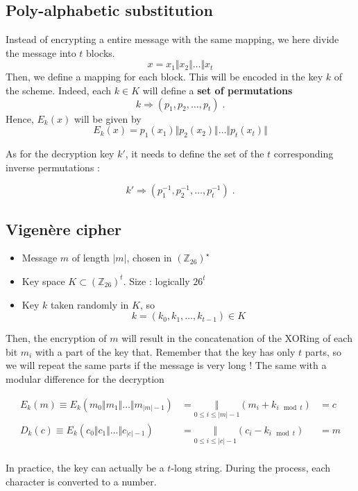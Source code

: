 \documentclass[../Cryptography.tex]{subfiles}
\begin{document}
\subsection{Poly-alphabetic substitution}
Instead of encrypting a entire message with the same mapping, we here divide the message into $t$ blocks.
$$ x = x_1 \Vert x_2 \Vert \dots \Vert x_t$$
Then, we define a mapping for each block. This will be encoded in the key $k$ of the scheme. Indeed, each $k\in K$ will define a \textbf{set of permutations} 
$$k \Rightarrow (p_1, p_2, \dots, p_t) \; .$$
Hence, $E_k(x)$ will be given by 
$$E_k(x) = p_1(x_1) \Vert p_2(x_2) \Vert \dots \Vert p_t(x_t) \Vert $$

As for the decryption key $k'$, it needs to define the set of the $t$ corresponding inverse permutations :

$$k' \Rightarrow (p_1^{-1}, p_2^{-1}, \dots, p_t^{-1}) \; .$$

\subsection{Vigenère cipher} 
\begin{itemize}
    \item Message $m$ of length $|m|$, chosen in $(\mathbb{Z}_{26})^\star$
    \item Key space $K \subset (\mathbb{Z}_{26})^t$. Size : logically $26^t$
    \item Key $k$ taken randomly in $K$, so 
    $$k = (k_0, k_1, \dots, k_{t-1}) \in K$$
\end{itemize}
Then, the encryption of $m$ will result in the concatenation of the XORing of each bit $m_i$ with a part of the key that. Remember that the key has only $t$ parts, so we will repeat the same parts if the message is very long ! The same with a modular difference for the decryption

$$\begin{array}{rll}
    E_k(m) \equiv E_k(m_0 \Vert m_1 \Vert \dots \Vert m_{|m|-1}) &=  \underset{\scriptscriptstyle{0\leq i \leq |m|-1}}{\Vert} (m_i + k_{i  \mod{t}}) &= c \\
    D_k(c) \equiv E_k(c_0 \Vert c_1 \Vert \dots \Vert c_{|c|-1}) &=  \underset{\scriptscriptstyle{0\leq i \leq |c|-1}}{\Vert} (c_i - k_{i  \mod{t}}) &= m \\
\end{array}$$

In practice, the key can actually be a $t$-long string. During the process, each character is converted to a number.
\end{document}
